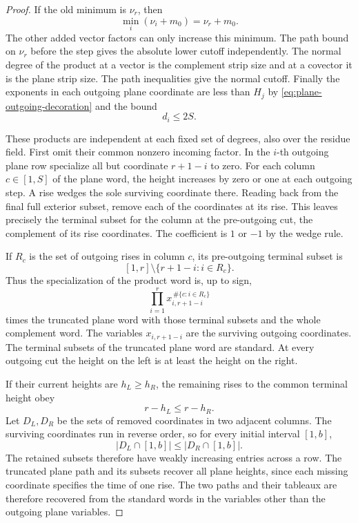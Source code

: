 \begin{proof}
If the old minimum is \(\nu_r\), then
\[
 \min_i(\nu_i+m_0)=\nu_r+m_0.
\]
The other added vector factors can only increase this minimum.
The path bound on \(\nu_r\) before the step gives the absolute
lower cutoff independently. The normal degree of the product
at a vector is the complement strip size and at a covector it
is the plane strip size. The path inequalities give the normal
cutoff. Finally the exponents in each outgoing plane coordinate
are less than \(H_j\) by \eqref{eq:plane-outgoing-decoration} and
the bound
\[
 d_i\le2S.
\]


These products are independent at each fixed set of degrees,
also over the residue field. First omit their common nonzero
incoming factor. In the \(i\)-th outgoing plane row specialize
all but coordinate \(r+1-i\) to zero. For each column
\(c\in[1,S]\) of the plane word, the height increases by zero
or one at each outgoing step. A rise wedges the sole surviving
coordinate there. Reading back from the final full exterior
subset, remove each of the coordinates at its rise. This leaves
precisely the terminal subset for the column at the pre-outgoing
cut, the complement of its rise coordinates. The coefficient is
\(1\) or \(-1\) by the wedge rule.

If \(R_c\) is the set of outgoing rises in column \(c\),
its pre-outgoing terminal subset is
\[
       [1,r]\setminus\{r+1-i:i\in R_c\}.
\]
Thus the specialization of the product word is, up to sign,
\[
 \prod_{i=1}^r x_{i,r+1-i}^{\,\#\{c:i\in R_c\}}
\]
times the
truncated plane word with those terminal subsets and the whole
complement word. The variables \(x_{i,r+1-i}\) are the surviving
outgoing coordinates.
The terminal subsets of the truncated plane word are standard.
At every outgoing cut the height on the left is at least the
height on the right.

If their current heights are \(h_L\ge h_R\), the remaining rises to the common terminal height obey
\[
 r-h_L\le r-h_R.
\]
Let \(D_L,D_R\) be the sets of removed coordinates in two adjacent columns. The surviving coordinates run in reverse order, so for every initial interval \([1,b]\), 
\[
 |D_L\cap[1,b]|\le|D_R\cap[1,b]|.
\]
 The retained
subsets therefore have weakly increasing entries across a row.
The truncated plane path and its subsets recover all
plane heights, since each missing coordinate specifies the time
of one rise. The two paths and their tableaux are therefore
recovered from the standard words in the variables other than
the outgoing plane variables.


\end{proof}
